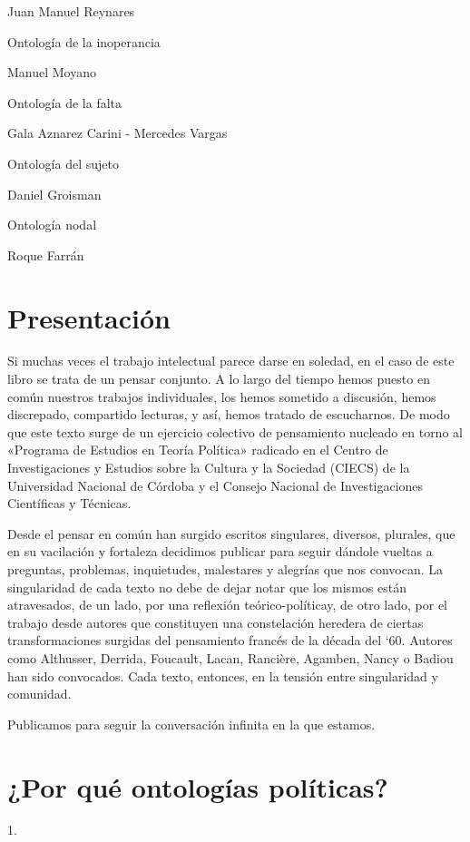 Juan Manuel Reynares

Ontología de la inoperancia

Manuel Moyano

Ontología de la falta

Gala Aznarez Carini - Mercedes Vargas

Ontología del sujeto

Daniel Groisman

Ontología nodal

Roque Farrán

\chapter{Presentación}

Si muchas veces el trabajo intelectual parece darse en soledad, en el caso de este libro se trata de un pensar conjunto. A lo largo del tiempo hemos puesto en común nuestros trabajos individuales, los hemos sometido a discusión, hemos discrepado, compartido lecturas, y así, hemos tratado de escucharnos. De modo que este texto surge de un ejercicio colectivo de pensamiento nucleado en torno al «Programa de Estudios en Teoría Política» radicado en el Centro de Investigaciones y Estudios sobre la Cultura y la Sociedad (CIECS) de la Universidad Nacional de Córdoba y el Consejo Nacional de Investigaciones Científicas y Técnicas.

Desde el pensar en común han surgido escritos singulares, diversos, plurales, que en su vacilación y fortaleza decidimos publicar para seguir dándole vueltas a preguntas, problemas, inquietudes, malestares y alegrías que nos convocan. La singularidad de cada texto no debe de dejar notar que los mismos están atravesados, de un lado, por una reflexión teórico-políticay, de otro lado, por el trabajo desde autores que constituyen una constelación heredera de ciertas transformaciones surgidas del pensamiento francés de la década del `60. Autores como Althusser, Derrida, Foucault, Lacan, Rancière, Agamben, Nancy o Badiou han sido convocados. Cada texto, entonces, en la tensión entre singularidad y comunidad.

Publicamos para seguir la conversación infinita en la que estamos.

\chapter{¿Por qué ontologías políticas?}

1.

